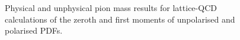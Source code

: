 \begin{figure}[p]
\begin{center}
{
}
\end{center}
\caption{Physical and unphysical pion mass results for lattice-QCD calculations of the zeroth and first moments
of unpolarised and polarised PDFs.}
\label{fig:latt_res}
\end{figure}



